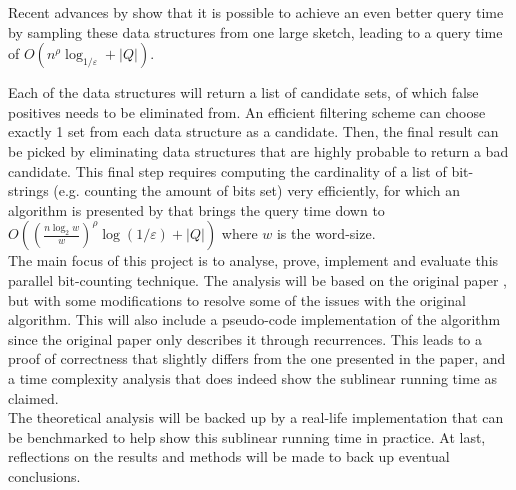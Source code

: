 Recent advances by \citet{fast-similarity-search} show that it is possible to achieve an even better query time by sampling these data structures from one large sketch, leading to a query time of $O(n^\rho \log_{1/\varepsilon} + |Q|)$.

Each of the data structures will return a list of candidate sets, of which false positives needs to be eliminated from. An efficient filtering scheme can choose exactly 1 set from each data structure as a candidate. Then, the final result can be picked by eliminating data structures that are highly probable to return a bad candidate. This final step requires computing the cardinality of a list of bit-strings (e.g. counting the amount of bits set) very efficiently, for which an algorithm is presented by \citet{fast-similarity-search} that brings the query time down to $O((\frac{n\log_2 w}{w})^\rho \log(1/\varepsilon) + |Q|)$ where $w$ is the word-size.\\
The main focus of this project is to analyse, prove, implement and evaluate this parallel bit-counting technique. The analysis will be based on the original paper \cite{fast-similarity-search}, but with some modifications to resolve some of the issues with the original algorithm. This will also include a pseudo-code implementation of the algorithm since the original paper only describes it through recurrences. This leads to a proof of correctness that slightly differs from the one presented in the paper, and a time complexity analysis that does indeed show the sublinear running time as claimed.\\
The theoretical analysis will be backed up by a real-life implementation that can be benchmarked to help show this sublinear running time in practice. At last, reflections on the results and methods will be made to back up eventual conclusions.

